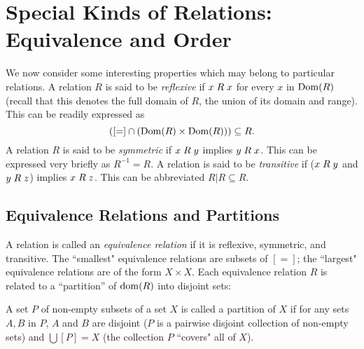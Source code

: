 \chapter[Equivalence and Order]{Special Kinds of
Relations:\\  Equivalence and Order}

We now consider some interesting properties
which may belong to particular relations.  A relation $R$ is said to be
{\itshape reflexive\/} if $x \mathrel{R} x$
for every $x$ in $\mathop{\mathrm{Dom}}(R)$ (recall that this 
denotes the full domain of $R$, the union of its domain and
range).
This can be readily expressed as
$$
 ([=] \cap (\mathop{\mathrm{Dom}}(R) \times \mathop{\mathrm{Dom}}(R))) \subseteq R.
$$
A relation $R$ is said to be {\itshape symmetric\/} if $x
\mathrel{R} y$ implies $y \mathrel{R} x$.  This can be expressed very briefly
as $R^{-1} = R$.  A relation is said to be {\itshape transitive\/} if
($x \mathrel{R} y$ and $y \mathrel{R} z$) implies $x \mathrel{R} z$.  This can
be abbreviated $R|R \subseteq R$.



\section[Equivalence Relations and Partitions]{Equivalence
Relations and Partitions}

A relation is called an {\itshape equivalence
relation\/} if it is
reflexive, symmetric, and
transitive.  The ``smallest" equivalence
relations are subsets of $[=]$; the ``largest" equivalence
relations are of the form $X \times X$.  Each equivalence relation $R$ is
related to a ``partition'' of $\mathop{\mathrm{dom}}(R)$ into disjoint sets:

\begin{definition}
 A set $P$ of non-empty subsets of a set $X$ is called a
 {\upshape partition\/} of $X$ if for any sets $A, B$
 in $P$, $A$ and $B$ are disjoint ($P$ is a pairwise disjoint collection of
 non-empty sets) and $\bigcup[P] = X$ (the collection $P$ ``covers" all of
 $X$).
\end{definition}

